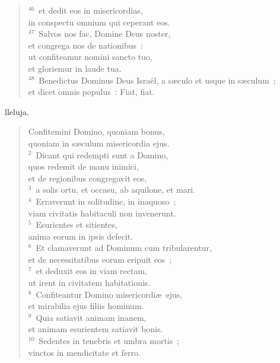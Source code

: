 \begin{flushleft}
\begin{verse}
${}^{46}$~et dedit eos in misericordias,\\ in conspectu omnium qui ceperant eos.\\
${}^{47}$~Salvos nos fac, Domine Deus noster,\\ et congrega nos de nationibus~:\\ ut confiteamur nomini sancto tuo,\\ et gloriemur in laude tua.\\
${}^{48}$~Benedictus Dominus Deus Isra\"el, a s\ae culo et usque in s\ae culum~;\\ et dicet omnis populus~: Fiat, fiat.\end{verse}\end{flushleft}



\bchapter
{}lleluja. \begin{flushleft}\begin{verse}\vspace{6pt}Confitemini Domino, quoniam bonus,\\ quoniam in s\ae culum misericordia ejus.\\
${}^{2}$~Dicant qui redempti sunt a Domino,\\ quos redemit de manu inimici,\\ et de regionibus congregavit eos,\\
${}^{3}$~a solis ortu, et occasu, ab aquilone, et mari.\\
${}^{4}$~Erraverunt in solitudine, in inaquoso~;\\ viam civitatis habitaculi non invenerunt.\\
${}^{5}$~Esurientes et sitientes,\\ anima eorum in ipsis defecit.\\
${}^{6}$~Et clamaverunt ad Dominum cum tribularentur,\\ et de necessitatibus eorum eripuit eos~;\\
${}^{7}$~et deduxit eos in viam rectam,\\ ut irent in civitatem habitationis.\\
${}^{8}$~Confiteantur Domino misericordi\ae\ ejus,\\ et mirabilia ejus filiis hominum.\\
${}^{9}$~Quia satiavit animam inanem,\\ et animam esurientem satiavit bonis.\\
${}^{10}$~Sedentes in tenebris et umbra mortis~;\\ vinctos in mendicitate et ferro.\\

\end{verse}
\end{flushleft}
